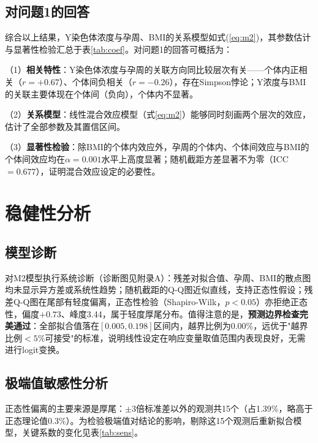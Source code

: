 \documentclass[12pt,a4paper]{ctexart}
\begin{document}
\subsection{对问题1的回答}

综合以上结果，Y染色体浓度与孕周、BMI的关系模型如式(\ref{eq:m2})，其参数估计与显著性检验汇总于表\ref{tab:coef}。对问题1的回答可概括为：

（1）\textbf{相关特性}：Y染色体浓度与孕周的关联方向同比较层次有关——个体内正相关（$r=+0.67$）、个体间负相关（$r=-0.26$），存在Simpson悖论；Y浓度与BMI的关联主要体现在个体间（负向），个体内不显著。

（2）\textbf{关系模型}：线性混合效应模型（式\ref{eq:m2}）能够同时刻画两个层次的效应，估计了全部参数及其置信区间。

（3）\textbf{显著性检验}：除BMI的个体内效应外，孕周的个体内、个体间效应与BMI的个体间效应均在$\alpha=0.001$水平上高度显著；随机截距方差显著不为零（ICC$=0.677$），证明混合效应设定的必要性。

\section{稳健性分析}

\subsection{模型诊断}

对M2模型执行系统诊断（诊断图见附录A）：残差对拟合值、孕周、BMI的散点图均未显示异方差或系统性趋势；随机截距的Q-Q图近似直线，支持正态性假设；残差Q-Q图在尾部有轻度偏离，正态性检验（Shapiro-Wilk，$p<0.05$）亦拒绝正态性，偏度$+0.73$、峰度3.44，属于轻度厚尾分布。值得注意的是，\textbf{预测边界检查完美通过}：全部拟合值落在$[0.005,0.198]$区间内，越界比例为0.00\%，远优于"越界比例$<5\%$可接受"的标准，说明线性设定在响应变量取值范围内表现良好，无需进行logit变换。

\subsection{极端值敏感性分析}

正态性偏离的主要来源是厚尾：$\pm3$倍标准差以外的观测共15个（占1.39\%，略高于正态理论值0.3\%）。为检验极端值对结论的影响，剔除这15个观测后重新拟合模型，关键系数的变化见表\ref{tab:sens}。
\end{document}
